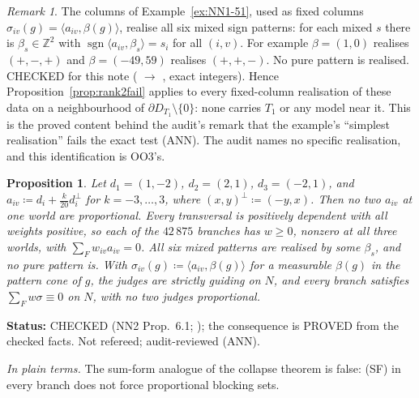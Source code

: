 \documentclass[11pt]{article}
\newtheorem{proposition}[theorem]{Proposition}
\theoremstyle{definition}
\theoremstyle{remark}
\newtheorem{remark}[theorem]{Remark}
\newcommand{\src}[1]{\textsf{#1}}
\newcommand{\status}[1]{\par\smallskip\noindent\textbf{Status:} #1\par}
\newcommand{\inwords}[1]{\noindent\textit{In plain terms.} #1\par\smallskip}
\begin{document}
\begin{remark}\label{rem:ex51-sixpatterns}
The columns of Example~\ref{ex:NN1-51}, used as fixed columns $\sigma_{iv}(g)=\langle a_{iv},\beta(g)\rangle$, realise all six mixed sign patterns: for each mixed $s$ there is $\beta_s\in\mathbb Z^2$ with $\operatorname{sgn}\langle a_{iv},\beta_s\rangle=s_i$ for all $(i,v)$. For example $\beta=(1,0)$ realises $(+,-,+)$ and $\beta=(-49,59)$ realises $(+,+,-)$. No pure pattern is realised. CHECKED for this note ( $\to$ , exact integers). Hence Proposition~\ref{prop:rank2fail} applies to every fixed-column realisation of these data on a neighbourhood of $\partial D_{T_1}\setminus\{0\}$: none carries $T_1$ or any model near it. This is the proved content behind the audit's remark that the example's ``simplest realisation'' fails the exact test (\src{ANN}). The audit names no specific realisation, and this identification is OO3's.
\end{remark}

\begin{proposition}\label{prop:sumform-escape}
Let $d_1=(1,-2)$, $d_2=(2,1)$, $d_3=(-2,1)$, and $a_{iv}\coloneqq d_i+\frac k{20}d_i^\perp$ for $k=-3,\dots,3$, where $(x,y)^\perp\coloneqq(-y,x)$. Then no two $a_{iv}$ at one world are proportional. Every transversal is positively dependent with all weights positive, so each of the $42\,875$ branches has $w\ge0$, nonzero at all three worlds, with $\sum_Fw_{iv}a_{iv}=0$. All six mixed patterns are realised by some $\beta_s$, and no pure pattern is. With $\sigma_{iv}(g)\coloneqq\langle a_{iv},\beta(g)\rangle$ for a measurable $\beta(g)$ in the pattern cone of $g$, the judges are strictly guiding on $N$, and every branch satisfies $\sum_Fw\sigma\equiv0$ on $N$, with no two judges proportional.
\end{proposition}
\status{CHECKED (\src{NN2} Prop.~6.1; \file{nn2py/sumform_escape.out}); the consequence is PROVED from the checked facts. Not refereed; audit-reviewed (\src{ANN}).}
\inwords{The sum-form analogue of the collapse theorem is false: (SF) in every branch does not force proportional blocking sets.}
\end{document}
